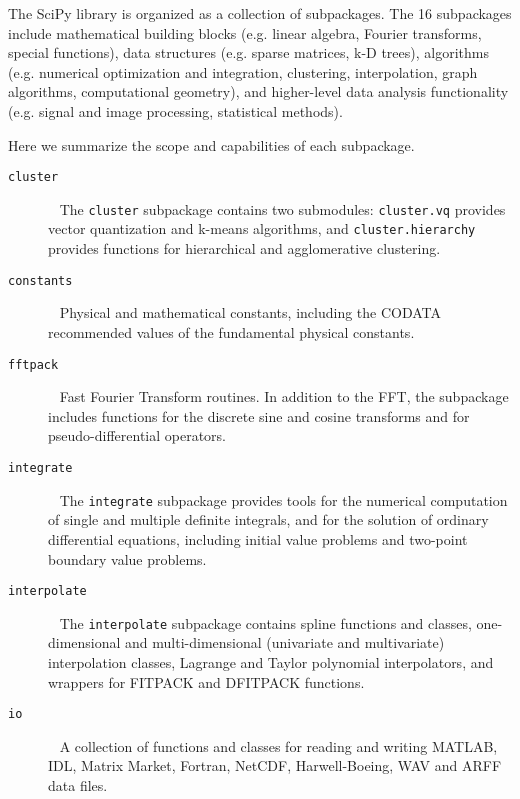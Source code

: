 The SciPy library is organized as a collection of subpackages.  The 16
subpackages include mathematical building blocks (e.g. linear algebra, Fourier
transforms, special functions), data structures (e.g. sparse matrices, k-D trees),
algorithms (e.g. numerical optimization and integration, clustering, interpolation,
graph algorithms, computational geometry), and higher-level data analysis
functionality (e.g. signal and image processing, statistical methods).

Here we summarize the scope and capabilities of each subpackage.

\begin{description}

\item[\texttt{cluster}] ~ \newline
    The \texttt{cluster} subpackage contains two submodules:
    \texttt{cluster.vq} provides vector quantization and k-means algorithms,
    and \texttt{cluster.hierarchy} provides functions for hierarchical and
    agglomerative clustering.
\item[\texttt{constants}] ~ \newline
    Physical and mathematical constants, including the CODATA recommended
    values of the fundamental physical constants\cite{CODATA2014}.
\item[\texttt{fftpack}] ~ \newline
    Fast Fourier Transform routines.  In addition to the FFT, the subpackage
    includes functions for the discrete sine and cosine transforms and for
    pseudo-differential operators.
\item[\texttt{integrate}] ~ \newline
    The \texttt{integrate} subpackage provides tools for the numerical
    computation of single and multiple definite integrals, and for the
    solution of ordinary differential equations, including initial value
    problems and two-point boundary value problems.
\item[\texttt{interpolate}] ~ \newline
    The \texttt{interpolate} subpackage contains spline functions and
    classes, one-dimensional and multi-dimensional (univariate and
    multivariate) interpolation classes, Lagrange and Taylor polynomial
    interpolators, and wrappers for FITPACK and DFITPACK functions.
\item[\texttt{io}] ~ \newline
    A collection of functions and classes for reading and writing MATLAB, IDL,
    Matrix Market, Fortran, NetCDF, Harwell-Boeing, WAV and ARFF data files. 

\end{description}
